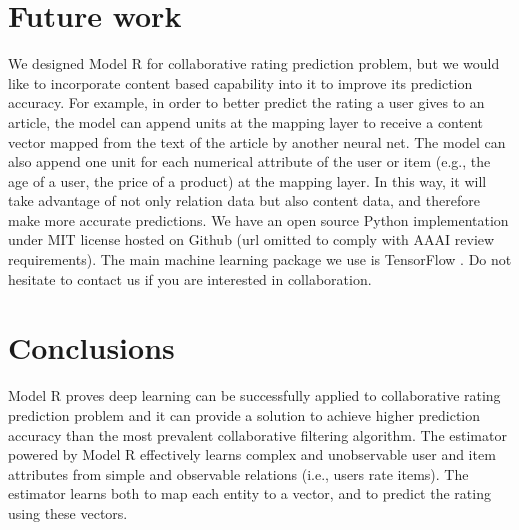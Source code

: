 \documentclass[letterpaper]{article}
\begin{document}
\section{Future work}
We designed Model R for collaborative rating prediction problem,
but we would like to incorporate content based capability into it to improve 
its prediction accuracy.
For example, in order to better predict the rating a user gives to an article,
the model can append units at the mapping layer to receive a content vector 
mapped from the text of the article by another neural net.
The model can also append one unit for each numerical attribute of the user or 
item (e.g., the age of a user, the price of a product) at the mapping layer.
In this way, it will take advantage of not only relation data but also content 
data, and therefore make more accurate predictions.
We have an open source Python implementation under MIT license hosted on Github 
(url omitted to comply with AAAI review requirements).
The main machine learning package we use is TensorFlow 
\citeauthor{abadi2016tensorflow}.
Do not hesitate to contact us if you are interested in collaboration.

\section{Conclusions}
Model R proves deep learning can be successfully applied to collaborative 
rating prediction problem and it can provide a solution to achieve higher 
prediction accuracy than the most prevalent collaborative filtering algorithm.
The estimator powered by Model R effectively learns complex and unobservable 
user and item attributes from simple and observable relations (i.e., users rate 
items).
The estimator learns both to map each entity to a vector, and to predict 
the rating using these vectors.



\end{document}
